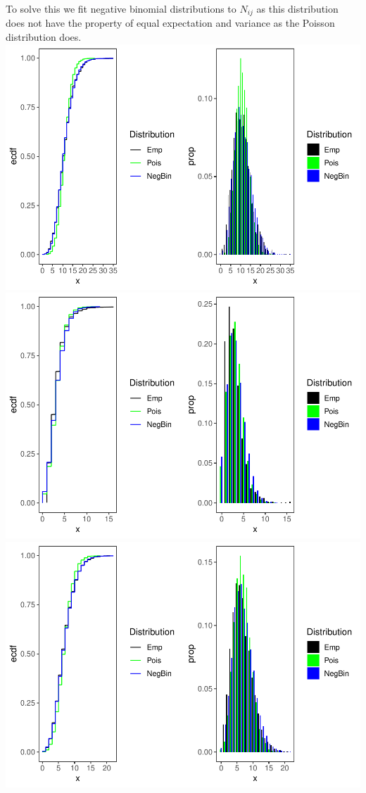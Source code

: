 \documentclass[]{article}
\begin{document}
To solve this we fit negative binomial distributions to \(N_{ij}\) as
this distribution does not have the property of equal expectation and
variance as the Poisson distribution does.
\includegraphics{Projekt1_files/figure-latex/unnamed-chunk-5-1.pdf}
\includegraphics{Projekt1_files/figure-latex/unnamed-chunk-5-2.pdf}
\includegraphics{Projekt1_files/figure-latex/unnamed-chunk-5-3.pdf}
\end{document}
